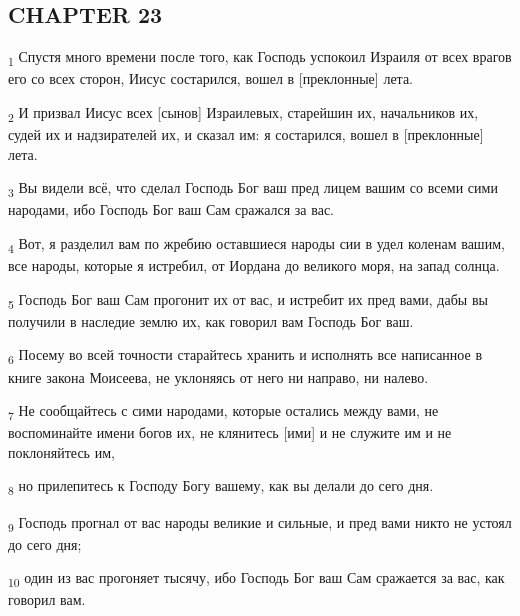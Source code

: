 \subsection{CHAPTER 23}
\begin{tcolorbox}
\textsubscript{1} Спустя много времени после того, как Господь успокоил Израиля от всех врагов его со всех сторон, Иисус состарился, вошел в [преклонные] лета.
\end{tcolorbox}
\begin{tcolorbox}
\textsubscript{2} И призвал Иисус всех [сынов] Израилевых, старейшин их, начальников их, судей их и надзирателей их, и сказал им: я состарился, вошел в [преклонные] лета.
\end{tcolorbox}
\begin{tcolorbox}
\textsubscript{3} Вы видели всё, что сделал Господь Бог ваш пред лицем вашим со всеми сими народами, ибо Господь Бог ваш Сам сражался за вас.
\end{tcolorbox}
\begin{tcolorbox}
\textsubscript{4} Вот, я разделил вам по жребию оставшиеся народы сии в удел коленам вашим, все народы, которые я истребил, от Иордана до великого моря, на запад солнца.
\end{tcolorbox}
\begin{tcolorbox}
\textsubscript{5} Господь Бог ваш Сам прогонит их от вас, и истребит их пред вами, дабы вы получили в наследие землю их, как говорил вам Господь Бог ваш.
\end{tcolorbox}
\begin{tcolorbox}
\textsubscript{6} Посему во всей точности старайтесь хранить и исполнять все написанное в книге закона Моисеева, не уклоняясь от него ни направо, ни налево.
\end{tcolorbox}
\begin{tcolorbox}
\textsubscript{7} Не сообщайтесь с сими народами, которые остались между вами, не воспоминайте имени богов их, не клянитесь [ими] и не служите им и не поклоняйтесь им,
\end{tcolorbox}
\begin{tcolorbox}
\textsubscript{8} но прилепитесь к Господу Богу вашему, как вы делали до сего дня.
\end{tcolorbox}
\begin{tcolorbox}
\textsubscript{9} Господь прогнал от вас народы великие и сильные, и пред вами никто не устоял до сего дня;
\end{tcolorbox}
\begin{tcolorbox}
\textsubscript{10} один из вас прогоняет тысячу, ибо Господь Бог ваш Сам сражается за вас, как говорил вам.
\end{tcolorbox}
